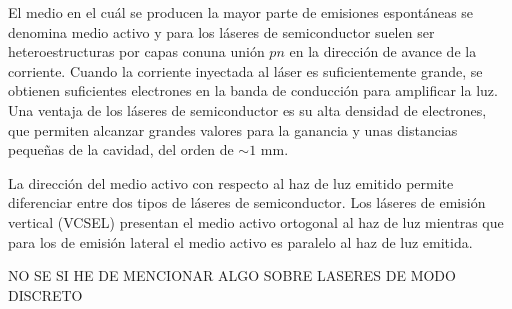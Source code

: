 El medio en el cu\'al se producen la mayor parte de emisiones espont\'aneas se denomina medio activo y para los l\'aseres de semiconductor suelen ser heteroestructuras por capas conuna uni\'on $pn$ en la direcci\'on de avance de la corriente. Cuando la corriente inyectada al l\'aser es suficientemente grande, se obtienen suficientes electrones en la banda de conducci\'on para amplificar la luz. Una ventaja de los l\'aseres de semiconductor es su alta densidad de electrones, que permiten alcanzar grandes valores para la ganancia y unas distancias pequeñas de la cavidad, del orden de $\sim 1$ mm.

La direcci\'on del medio activo con respecto al haz de luz emitido permite diferenciar entre dos tipos de l\'aseres de semiconductor. Los l\'aseres de emisi\'on vertical (VCSEL) presentan el medio activo ortogonal al haz de luz mientras que para los de emisión lateral el medio activo es paralelo al haz de luz emitida. 

NO SE SI HE DE MENCIONAR ALGO SOBRE LASERES DE MODO DISCRETO
